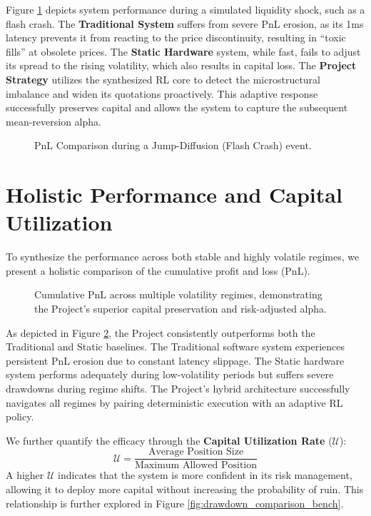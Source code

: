 Figure \ref{fig:adverse_selection_pnl} depicts system performance during a simulated liquidity shock, such as a flash crash. The \textbf{Traditional System} suffers from severe PnL erosion, as its 1ms latency prevents it from reacting to the price discontinuity, resulting in ``toxic fills'' at obsolete prices. The \textbf{Static Hardware} system, while fast, fails to adjust its spread to the rising volatility, which also results in capital loss. The \textbf{Project Strategy} utilizes the synthesized RL core to detect the microstructural imbalance and widen its quotations proactively. This adaptive response successfully preserves capital and allows the system to capture the subsequent mean-reversion alpha.

\begin{figure}
    \centering
    
    \caption{PnL Comparison during a Jump-Diffusion (Flash Crash) event.}
    \label{fig:adverse_selection_pnl}
\end{figure}
\clearpage

\section{Holistic Performance and Capital Utilization}
To synthesize the performance across both stable and highly volatile regimes, we present a holistic comparison of the cumulative profit and loss (PnL).

\begin{figure}
    \centering
    
    \caption{Cumulative PnL across multiple volatility regimes, demonstrating the Project's superior capital preservation and risk-adjusted alpha.}
    \label{fig:comparative_pnl_holistic}
\end{figure}
\clearpage

As depicted in Figure \ref{fig:comparative_pnl_holistic}, the Project consistently outperforms both the Traditional and Static baselines. The Traditional software system experiences persistent PnL erosion due to constant latency slippage. The Static hardware system performs adequately during low-volatility periods but suffers severe drawdowns during regime shifts. The Project's hybrid architecture successfully navigates all regimes by pairing deterministic execution with an adaptive RL policy.

We further quantify the efficacy through the \textbf{Capital Utilization Rate} ($\mathcal{U}$):
\begin{equation}
    \mathcal{U} = \frac{\text{Average Position Size}}{\text{Maximum Allowed Position}}
\end{equation}
A higher $\mathcal{U}$ indicates that the system is more confident in its risk management, allowing it to deploy more capital without increasing the probability of ruin. This relationship is further explored in Figure \ref{fig:drawdown_comparison_bench}.

